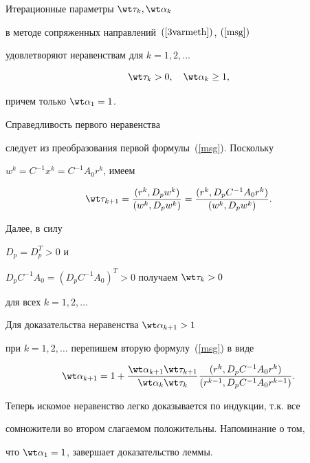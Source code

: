 \begin{lem} Итерационные параметры $\wt \tau_k, \wt \alpha_k$


в методе сопряженных направлений~$(\ref{3varmeth})$, $(\ref{msg})$


удовлетворяют неравенствам для $ k =1, 2, \dotsc$


$$


\wt \tau_k > 0, \quad \wt \alpha_k \geq 1,


$$


причем только $\wt \alpha_1 = 1$.


\end{lem}





\begin{pf} Справедливость первого неравенства


следует из преобразования первой формулы~(\ref{msg}). Поскольку


$w^k = C^{-1} x^k = C^{-1}A_0 r^k$, имеем


$$


\wt \tau_{k+1} = \frac{(r^k,D_p w^k)}{(w^k,D_p w^k)}


= \frac{(r^k,D_p C^{-1}A_0 r^k)}{(w^k,D_p w^k)}.


$$


Далее, в силу


$D_p = D_p^T > 0$ и


$D_pC^{-1}A_0 = (D_pC^{-1}A_0)^T > 0$ получаем $\wt \tau_k > 0$


для всех $ k = 1, 2, \dotsc$





Для доказательства неравенства $\wt \alpha_{k+1} > 1$


при $k = 1, 2, \dotsc$ перепишем вторую формулу~(\ref{msg}) в виде


$$


\wt \alpha_{k+1} = 1 +


\frac{\wt \alpha_{k+1} \wt \tau_{k+1}}{\wt \alpha_{k} \wt \tau_{k}}


\frac{(r^k,D_p C^{-1}A_0 r^k)}{(r^{k-1},D_p C^{-1}A_0 r^{k-1})}.


$$


Теперь искомое неравенство легко доказывается по индукции, т.к. все


сомножители во втором слагаемом положительны. Напоминание о том,


что $\wt \alpha_1 = 1$, завершает доказательство леммы.


\end{pf}





